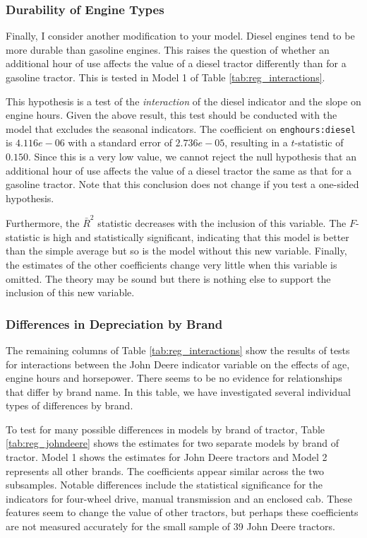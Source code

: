 \documentclass[11pt]{paper}
\begin{document}
\subsubsection{Durability of Engine Types}

Finally, I consider another modification to your model. 
Diesel engines tend to be more durable than gasoline engines. 
This raises the question of whether an additional hour of use affects the value of a diesel tractor differently than for a gasoline tractor. 
This is tested in Model 1 of Table \ref{tab:reg_interactions}. 

	This hypothesis is a test of the \emph{interaction} of the diesel indicator and the slope on engine hours. 
      Given the above result, this test should be conducted with the model that excludes the seasonal indicators. 
The coefficient on \texttt{enghours:diesel} is $4.116e-06$ with a standard error of $2.736e-05$, resulting in a $t$-statistic of $0.150$. 
Since this is a very low value, we cannot reject the null hypothesis that an additional hour of use affects the value of a diesel tractor the same as that for a gasoline tractor. 
Note that this conclusion does not change if you test a one-sided hypothesis.  

Furthermore, the $\bar{R}^2$ statistic decreases with the inclusion of this variable. 
The $F$-statistic is high and statistically significant, indicating that this model is better than the simple average but so is the model without this new variable. 
Finally, the estimates of the other coefficients change very little when this variable is omitted. 
The theory may be sound but there is nothing else to support the inclusion of this new variable. 

\pagebreak
\subsubsection{Differences in Depreciation by Brand}

The remaining columns of Table \ref{tab:reg_interactions}
show the results of tests for interactions
between the John Deere indicator variable
on the effects of age, engine hours and horsepower. 
There seems to be no evidence for relationships that differ by
brand name. 
In this table, we have investigated several 
individual types of differences by brand. 



To test for many possible differences in 
models by brand of tractor, 
Table \ref{tab:reg_johndeere}
shows the estimates for two separate models
by brand of tractor.
Model 1 shows the estimates for John Deere tractors
and Model 2 represents all other brands. 
The coefficients appear similar across the two subsamples.
Notable differences include the statistical significance for 
the indicators for four-wheel drive, 
manual transmission and an enclosed cab. 
These features seem to change the value of 
other tractors, but perhaps these coefficients are not measured 
accurately for the small sample of 39 
John Deere tractors. 
\end{document}
